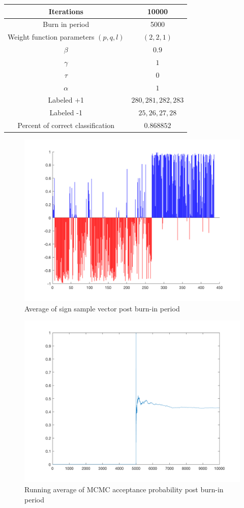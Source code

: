 \documentclass{siamart1116}
\begin{document}
\begin{center}
\begin{tabular}{| c | c |}
\hline
Iterations & 10000 \\ \hline
Burn in period & 5000 \\ \hline
Weight function parameters $(p, q, l)$ & $(2,2,1)$ \\ \hline
$\beta$ & $0.9$\\ \hline
$\gamma$ & $1$\\ \hline
$\tau$ & $0$\\ \hline
$\alpha$ & $1$\\ \hline
Labeled +1 & $280, 281, 282, 283$ \\ \hline
Labeled -1 & $25, 26, 27, 28$ \\ \hline
Percent of correct classification & $0.868852$ \\ \hline
\end{tabular}
\end{center}
\begin{figure}[htbp]
    \centering
    \label{fig:gamma_fig}
    \caption{Average of sign sample vector post burn-in period}
    \includegraphics[width=.5\linewidth]{gamma_avg.png}
\end{figure}
\begin{figure}[htbp]
    \centering
    \label{fig:gamma_prob}
    \caption{Running average of MCMC acceptance probability post burn-in period}
    \includegraphics[width=.5\linewidth]{gamma_probability.png}
\end{figure}
\end{document}
